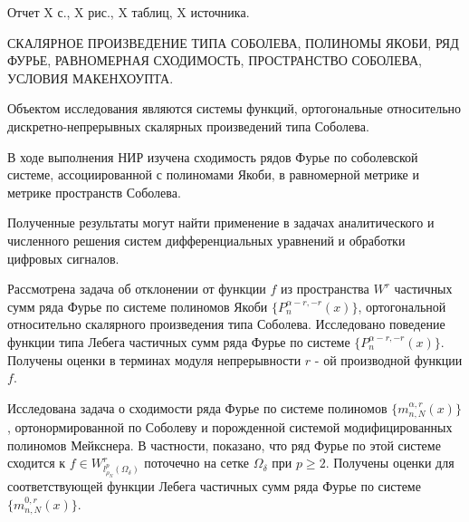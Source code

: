 \Referat %

Отчет X с., X рис., X таблиц, X источника. 

\MakeUppercase{скалярное произведение типа Соболева, полиномы Якоби, ряд Фурье, равномерная сходимость, пространство Соболева, условия Макенхоупта.}

Объектом исследования являются системы функций, ортогональные относительно дискретно-непрерывных скалярных произведений типа Соболева.

В ходе выполнения НИР изучена сходимость рядов Фурье по соболевской системе, ассоциированной с полиномами Якоби, в равномерной метрике и метрике пространств Соболева. 

Полученные результаты могут найти применение в задачах аналитического и численного решения систем дифференциальных уравнений и обработки цифровых сигналов. 

Рассмотрена задача об отклонении от функции $f$ из пространства $W^r$ частичных сумм ряда Фурье по системе полиномов Якоби $\{P_n^{\alpha-r,-r}(x)\}$, ортогональной относительно скалярного произведения типа Соболева. Исследовано поведение функции типа Лебега частичных сумм ряда Фурье по системе $\{P_n^{\alpha-r,-r}(x)\}$. Получены оценки в терминах модуля непрерывности $r$ - ой производной функции $f$.

Исследована задача о сходимости ряда Фурье по системе полиномов $\{m_{n,N}^{\alpha,r}(x)\}$, ортонормированной по Соболеву и порожденной системой модифицированных полиномов Мейкснера. В частности, показано, что ряд Фурье по этой системе сходится к $f\in W^r_{l^p_{\rho_N}(\Omega_\delta)}$ поточечно на сетке $\Omega_\delta$ при $p\ge2$. Получены оценки для соответствующей функции Лебега частичных сумм ряда Фурье по системе $\{m_{n,N}^{0,r}(x)\}$. 